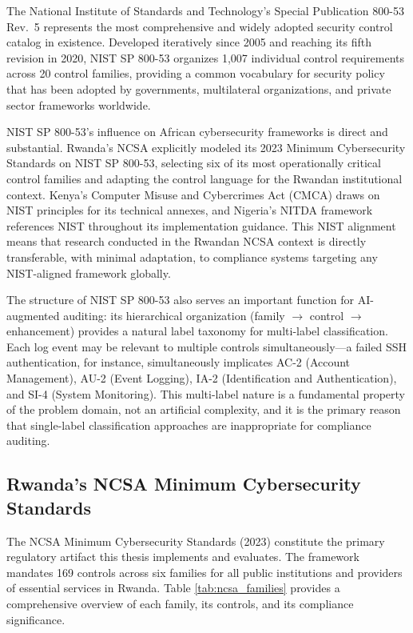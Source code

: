 \documentclass[12pt,oneside]{report}
\begin{document}
The National Institute of Standards and Technology's Special Publication 800-53 Rev.\ 5 \cite{nist2020} represents the most comprehensive and widely adopted security control catalog in existence. Developed iteratively since 2005 and reaching its fifth revision in 2020, NIST SP 800-53 organizes 1,007 individual control requirements across 20 control families, providing a common vocabulary for security policy that has been adopted by governments, multilateral organizations, and private sector frameworks worldwide.

NIST SP 800-53's influence on African cybersecurity frameworks is direct and substantial. Rwanda's NCSA explicitly modeled its 2023 Minimum Cybersecurity Standards on NIST SP 800-53, selecting six of its most operationally critical control families and adapting the control language for the Rwandan institutional context. Kenya's Computer Misuse and Cybercrimes Act (CMCA) \cite{kenya_cyber_law} draws on NIST principles for its technical annexes, and Nigeria's NITDA framework \cite{nigeria_cyber} references NIST throughout its implementation guidance. This NIST alignment means that research conducted in the Rwandan NCSA context is directly transferable, with minimal adaptation, to compliance systems targeting any NIST-aligned framework globally.

The structure of NIST SP 800-53 also serves an important function for AI-augmented auditing: its hierarchical organization (family $\rightarrow$ control $\rightarrow$ enhancement) provides a natural label taxonomy for multi-label classification. Each log event may be relevant to multiple controls simultaneously—a failed SSH authentication, for instance, simultaneously implicates AC-2 (Account Management), AU-2 (Event Logging), IA-2 (Identification and Authentication), and SI-4 (System Monitoring). This multi-label nature is a fundamental property of the problem domain, not an artificial complexity, and it is the primary reason that single-label classification approaches are inappropriate for compliance auditing.

\subsection{Rwanda's NCSA Minimum Cybersecurity Standards}

The NCSA Minimum Cybersecurity Standards (2023) \cite{ncsa2023} constitute the primary regulatory artifact this thesis implements and evaluates. The framework mandates 169 controls across six families for all public institutions and providers of essential services in Rwanda. Table \ref{tab:ncsa_families} provides a comprehensive overview of each family, its controls, and its compliance significance.
\end{document}
